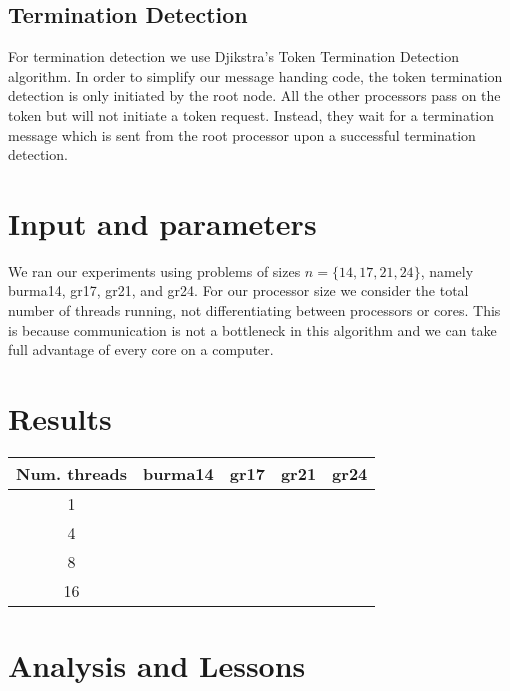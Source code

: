 \documentclass{article}
\begin{document}
\subsection{Termination Detection}
\label{sec:term_detect}

For termination detection we use Djikstra's Token Termination Detection algorithm. 
In order to simplify our message handing code, the token termination detection is only
initiated by the root node.  All the other processors pass on the token but will not 
initiate a token request.  Instead, they wait for a termination message which is sent 
from the root processor upon a successful termination detection.



\section{Input and parameters}

We ran our experiments using problems of sizes $n = \{ 14, 17, 21, 24 \}$,
namely burma14, gr17, gr21, and gr24.  For our processor size we consider the total number 
of threads running, not differentiating between processors or cores.  This is because
communication is not a bottleneck in this algorithm and we can take full advantage of every core
on a computer.

\section{Results}

\begin{table}
	\centering
	\begin{tabular}{|c|c|c|c|c|}
	\hline
	Num. threads & burma14 	& gr17 	& gr21 	& gr24 \\ \hline
	1			 &			&		& 		&		\\ \hline
	4			 &			&		&		&		\\ \hline
	8			 &			& 		& 		& 		\\ \hline
	16			 & 			& 		& 		& 		\\ \hline
	\end{tabular}
\end{table}

\section{Analysis and Lessons}

\clearpage

\appendix





\end{document}
